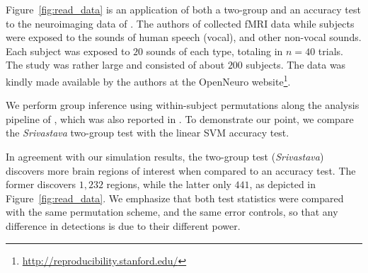 \documentclass[journal]{IEEEtran}
\begin{document}
Figure~\ref{fig:read_data} is an application of both a two-group and an accuracy test to the neuroimaging data of \cite{pernet_human_2015}. 
The authors of \cite{pernet_human_2015} collected fMRI data while subjects were exposed to the sounds of human speech (vocal), and other non-vocal sounds. 
Each subject was exposed to $20$ sounds of each type, totaling in $n=40$ trials.
The study was rather large and consisted of about $200$ subjects.
The data was kindly made available by the authors at the OpenNeuro website\footnote{\url{http://reproducibility.stanford.edu/}}.

We perform group inference using within-subject permutations along the analysis pipeline of \cite{stelzer_statistical_2013}, which was also reported in \cite{gilron_quantifying_2016}. 
To demonstrate our point, we compare the \emph{Srivastava} two-group test with the linear SVM accuracy test. 

In agreement with our simulation results, the two-group test (\emph{Srivastava}) discovers more brain regions of interest when compared to an accuracy test.
The former discovers $1,232$ regions, while the latter only $441$, as depicted in Figure~\ref{fig:read_data}.
We emphasize that both test statistics were compared with the same permutation scheme, and the same error controls, so that any difference in detections is due to their different power.
\end{document}
